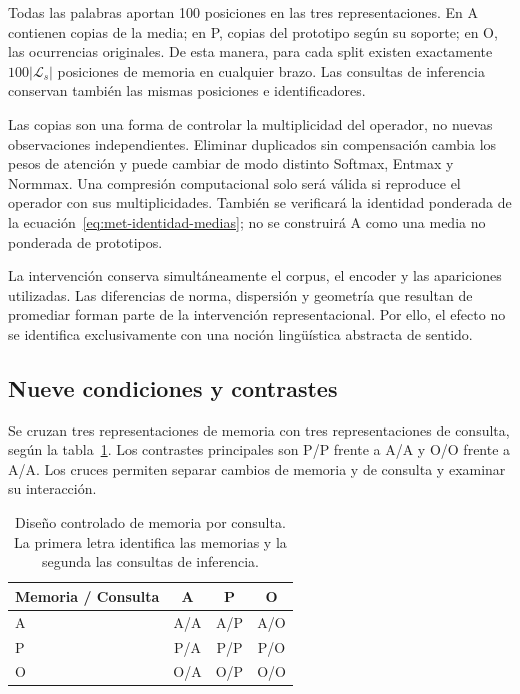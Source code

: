 Todas las palabras aportan 100 posiciones en las tres representaciones. En A contienen copias de la media; en P, copias del prototipo según su soporte; en O, las ocurrencias originales. De esta manera, para cada split existen exactamente $100|\mathcal L_s|$ posiciones de memoria en cualquier brazo. Las consultas de inferencia conservan también las mismas posiciones e identificadores.

Las copias son una forma de controlar la multiplicidad del operador, no nuevas observaciones independientes. Eliminar duplicados sin compensación cambia los pesos de atención y puede cambiar de modo distinto Softmax, Entmax y Normmax. Una compresión computacional solo será válida si reproduce el operador con sus multiplicidades. También se verificará la identidad ponderada de la ecuación~\eqref{eq:met-identidad-medias}; no se construirá A como una media no ponderada de prototipos.

La intervención conserva simultáneamente el corpus, el encoder y las apariciones utilizadas. Las diferencias de norma, dispersión y geometría que resultan de promediar forman parte de la intervención representacional. Por ello, el efecto no se identifica exclusivamente con una noción lingüística abstracta de sentido.

\subsection{Nueve condiciones y contrastes}

Se cruzan tres representaciones de memoria con tres representaciones de consulta, según la tabla~\ref{tab:met-factorial}. Los contrastes principales son P/P frente a A/A y O/O frente a A/A. Los cruces permiten separar cambios de memoria y de consulta y examinar su interacción.

\begin{table}[tbp]
\centering
\caption{Diseño controlado de memoria por consulta. La primera letra identifica las memorias y la segunda las consultas de inferencia.}
\label{tab:met-factorial}
\begin{tabular}{@{}lccc@{}}
\toprule
Memoria / Consulta & A & P & O \\
\midrule
A & A/A & A/P & A/O \\
P & P/A & P/P & P/O \\
O & O/A & O/P & O/O \\
\bottomrule
\end{tabular}
\end{table}

